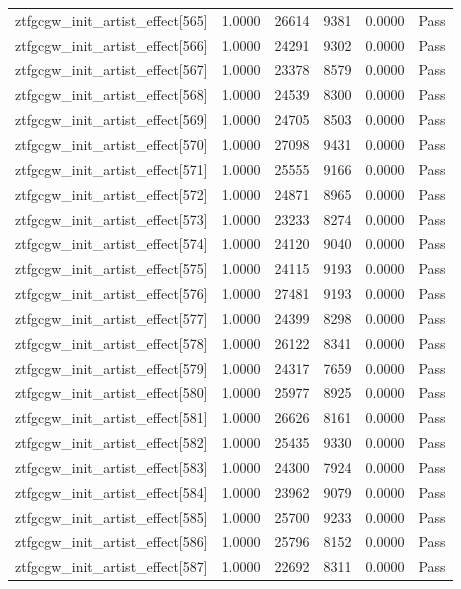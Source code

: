 \begin{table}[htbp]
\begin{tabular}{llrrll}
ztfgcgw\_init\_artist\_effect[565] & 1.0000 & 26614 & 9381 & 0.0000 & Pass \\
ztfgcgw\_init\_artist\_effect[566] & 1.0000 & 24291 & 9302 & 0.0000 & Pass \\
ztfgcgw\_init\_artist\_effect[567] & 1.0000 & 23378 & 8579 & 0.0000 & Pass \\
ztfgcgw\_init\_artist\_effect[568] & 1.0000 & 24539 & 8300 & 0.0000 & Pass \\
ztfgcgw\_init\_artist\_effect[569] & 1.0000 & 24705 & 8503 & 0.0000 & Pass \\
ztfgcgw\_init\_artist\_effect[570] & 1.0000 & 27098 & 9431 & 0.0000 & Pass \\
ztfgcgw\_init\_artist\_effect[571] & 1.0000 & 25555 & 9166 & 0.0000 & Pass \\
ztfgcgw\_init\_artist\_effect[572] & 1.0000 & 24871 & 8965 & 0.0000 & Pass \\
ztfgcgw\_init\_artist\_effect[573] & 1.0000 & 23233 & 8274 & 0.0000 & Pass \\
ztfgcgw\_init\_artist\_effect[574] & 1.0000 & 24120 & 9040 & 0.0000 & Pass \\
ztfgcgw\_init\_artist\_effect[575] & 1.0000 & 24115 & 9193 & 0.0000 & Pass \\
ztfgcgw\_init\_artist\_effect[576] & 1.0000 & 27481 & 9193 & 0.0000 & Pass \\
ztfgcgw\_init\_artist\_effect[577] & 1.0000 & 24399 & 8298 & 0.0000 & Pass \\
ztfgcgw\_init\_artist\_effect[578] & 1.0000 & 26122 & 8341 & 0.0000 & Pass \\
ztfgcgw\_init\_artist\_effect[579] & 1.0000 & 24317 & 7659 & 0.0000 & Pass \\
ztfgcgw\_init\_artist\_effect[580] & 1.0000 & 25977 & 8925 & 0.0000 & Pass \\
ztfgcgw\_init\_artist\_effect[581] & 1.0000 & 26626 & 8161 & 0.0000 & Pass \\
ztfgcgw\_init\_artist\_effect[582] & 1.0000 & 25435 & 9330 & 0.0000 & Pass \\
ztfgcgw\_init\_artist\_effect[583] & 1.0000 & 24300 & 7924 & 0.0000 & Pass \\
ztfgcgw\_init\_artist\_effect[584] & 1.0000 & 23962 & 9079 & 0.0000 & Pass \\
ztfgcgw\_init\_artist\_effect[585] & 1.0000 & 25700 & 9233 & 0.0000 & Pass \\
ztfgcgw\_init\_artist\_effect[586] & 1.0000 & 25796 & 8152 & 0.0000 & Pass \\
ztfgcgw\_init\_artist\_effect[587] & 1.0000 & 22692 & 8311 & 0.0000 & Pass \\

\end{tabular}
\end{table}
